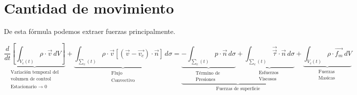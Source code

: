 \documentclass[10pt,a4paper]{article}
\begin{document}
\section{Cantidad de movimiento}
De esta fórmula podemos extraer fuerzas principalmente.
\begin{center}
    \begin{tcolorbox}[colback=yellow!40!white, colframe=red!50!black,title=Cantidad de movimiento]
    $$
        \underbrace{\frac{d}{dt} \left[\int_{V_c(t)}^{} \rho \cdot \vec{v} \,dV \right] }_{\substack{\text{Variación temporal del} \\ \text{volumen de control} \\ \text{} \\ \text{Estacionario $\xrightarrow{}$ 0}}} + \underbrace{\int_{\sum_c(t)}^{} \rho \cdot \vec{v} \left[\left(\vec{v} - \vec{v_c}\right) \cdot \vec{n} \right] \, d\sigma}_{\substack{{\text {Flujo }} \\ {\text{Convectivo}}}} =
        \underbrace{\underbrace{-\int_{\sum_c(t)}^{}p \cdot \vec{n} \, d\sigma}_{\substack{\text{Término de } \\  {\text{Presiones}}}} + \underbrace{\int_{\sum_c(t)}^{}\vec{\vec{\tau}} \cdot \vec{n} \, d\sigma}_{\substack{\text{Esfuerzos } \\  {\text{Viscosos}}}}}_{\text{Fuerzas de superficie}} + \underbrace{\int_{V_c(t)}^{}\rho \cdot \vec{f_m} \, dV}_{\substack{\text{Fuerzas } \\  {\text{Masicas}}}}
    $$
    \end{tcolorbox}
\end{center}
\end{document}
